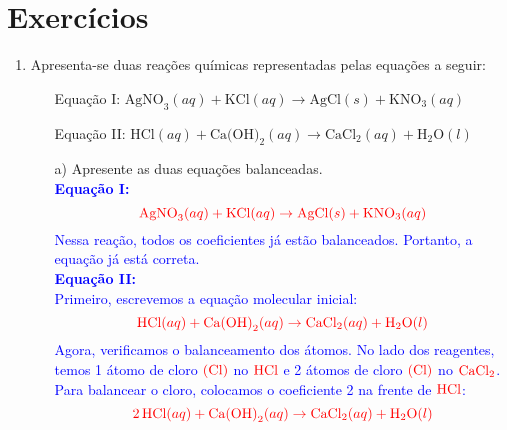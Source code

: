\documentclass[a4paper, 12pt]{article}
\begin{document}
\section*{Exercícios}
\begin{enumerate}

    \item Apresenta-se duas reações químicas representadas pelas equações a seguir:
          \begin{itemize}
              \item[] Equação I:
                    $\text{AgNO}_{3} (aq) + \text{KCl}(aq) \rightarrow \text{AgCl}(s) + \text{KNO}
                        _{3} (aq)$
              \item[] Equação II:
                    $\text{HCl}(aq) + \text{Ca(OH)}_{2}(aq) \rightarrow \text{CaCl}_{2}(aq)
                        + \text{H}_{2}\text{O}(l)$
          \end{itemize}
          \begin{enumerate}[align=left, labelsep=-0.5em]
              \item[a)] Apresente as duas equações balanceadas.
                    \\[10pt]
                    \textcolor{blue}{\textbf{Equação I:}}
                    \[
                        \textcolor{red}{\text{AgNO}_3 (aq) + \text{KCl} (aq) \rightarrow \text{AgCl} (s) + \text{KNO}_3 (aq)}
                    \]
                    \textcolor{blue}{Nessa reação, todos os coeficientes já estão  balanceados. Portanto, a equação já está correta.}
                    \\[10pt]
                    \textcolor{blue}{\textbf{Equação II:}}
                    \\[10pt]
                    \textcolor{blue}{Primeiro, escrevemos a equação molecular inicial:}
                    \[
                        \textcolor{red}{\text{HCl} (aq) + \text{Ca(OH)}_2 (aq) \rightarrow \text{CaCl}_2 (aq) + \text{H}_2\text{O} (l)}
                    \]
                    \textcolor{blue}{Agora, verificamos o balanceamento dos átomos. No lado dos reagentes, temos 1 átomo de cloro \(\textcolor{red}{(\text{Cl})}\) no \(\textcolor{red}{\text{HCl}}\) e 2 átomos de cloro \(\textcolor{red}{(\text{Cl})}\) no \(\textcolor{red}{\text{CaCl}_2}\). Para balancear o cloro, colocamos o coeficiente 2 na frente de \(\textcolor{red}{\text{HCl}}\):}
                    \[
                        \textcolor{red}{2 \, \text{HCl} (aq) + \text{Ca(OH)}_2 (aq) \rightarrow \text{CaCl}_2 (aq) + \text{H}_2\text{O} (l)}
\]
\end{enumerate}
\end{enumerate}
\end{document}
